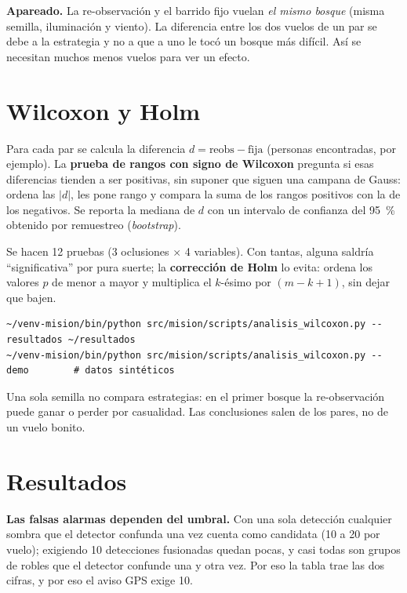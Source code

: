 \begin{consejo}
\textbf{Apareado.} La re-observación y el barrido fijo vuelan \emph{el mismo bosque} (misma semilla,
iluminación y viento). La diferencia entre los dos vuelos de un par se debe a la estrategia y no a que a
uno le tocó un bosque más difícil. Así se necesitan muchos menos vuelos para ver un efecto.
\end{consejo}

\section{Wilcoxon y Holm}

Para cada par se calcula la diferencia $d = \text{reobs} - \text{fija}$ (personas encontradas, por
ejemplo). La \textbf{prueba de rangos con signo de Wilcoxon} pregunta si esas diferencias tienden a ser
positivas, sin suponer que siguen una campana de Gauss: ordena las $|d|$, les pone rango y compara la
suma de los rangos positivos con la de los negativos. Se reporta la mediana de $d$ con un intervalo de
confianza del 95~\% obtenido por remuestreo (\emph{bootstrap}).

Se hacen 12 pruebas (3 oclusiones $\times$ 4 variables). Con tantas, alguna saldría ``significativa'' por
pura suerte; la \textbf{corrección de Holm} lo evita: ordena los valores $p$ de menor a mayor y multiplica
el $k$-ésimo por $(m-k+1)$, sin dejar que bajen.

\begin{lstlisting}[style=bash]
~/venv-mision/bin/python src/mision/scripts/analisis_wilcoxon.py --resultados ~/resultados
~/venv-mision/bin/python src/mision/scripts/analisis_wilcoxon.py --demo        # datos sintéticos
\end{lstlisting}

\begin{aviso}
Una sola semilla no compara estrategias: en el primer bosque la re-observación puede ganar o perder por
casualidad. Las conclusiones salen de los pares, no de un vuelo bonito.
\end{aviso}

\section{Resultados}


\begin{leccion}
\textbf{Las falsas alarmas dependen del umbral.} Con una sola detección cualquier sombra que el detector
confunda una vez cuenta como candidata (10 a 20 por vuelo); exigiendo 10 detecciones fusionadas quedan
pocas, y casi todas son grupos de robles que el detector confunde una y otra vez. Por eso la tabla trae
las dos cifras, y por eso el aviso GPS exige 10.
\end{leccion}
